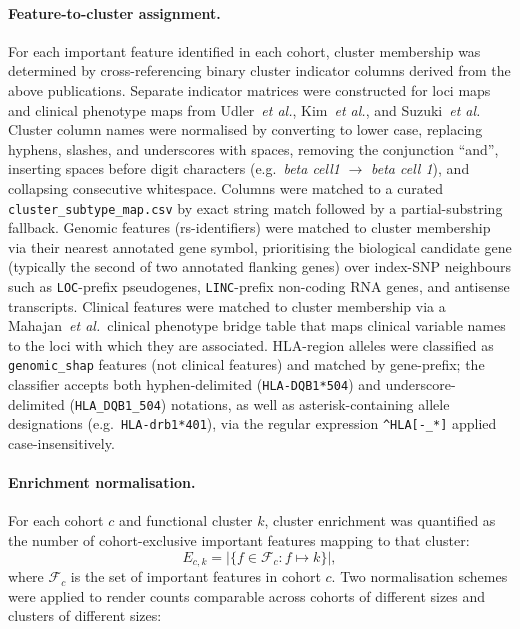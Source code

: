 \paragraph{Feature-to-cluster assignment.}
For each important feature identified in each cohort, cluster membership was determined by cross-referencing binary cluster indicator columns derived from the above publications.
Separate indicator matrices were constructed for loci maps and clinical phenotype maps from Udler~\textit{et al.}, Kim~\textit{et al.}, and Suzuki~\textit{et al.}
Cluster column names were normalised by converting to lower case, replacing hyphens, slashes, and underscores with spaces, removing the conjunction ``and'', inserting spaces before digit characters (e.g.\ \textit{beta cell1} $\to$ \textit{beta cell 1}), and collapsing consecutive whitespace.
Columns were matched to a curated \texttt{cluster\_subtype\_map.csv} by exact string match followed by a partial-substring fallback.
Genomic features (rs-identifiers) were matched to cluster membership via their nearest annotated gene symbol, prioritising the biological candidate gene (typically the second of two annotated flanking genes) over index-SNP neighbours such as \texttt{LOC}-prefix pseudogenes, \texttt{LINC}-prefix non-coding RNA genes, and antisense transcripts.
Clinical features were matched to cluster membership via a Mahajan~\textit{et al.}\ clinical phenotype bridge table that maps clinical variable names to the loci with which they are associated.
HLA-region alleles were classified as \texttt{genomic\_shap} features (not clinical features) and matched by gene-prefix; the classifier accepts both hyphen-delimited (\texttt{HLA-DQB1*504}) and underscore-delimited (\texttt{HLA\_DQB1\_504}) notations, as well as asterisk-containing allele designations (e.g.\ \texttt{HLA-drb1*401}), via the regular expression \texttt{\^{}HLA[-\_*]} applied case-insensitively.

\paragraph{Enrichment normalisation.}
For each cohort $c$ and functional cluster $k$, cluster enrichment was quantified as the number of cohort-exclusive important features mapping to that cluster:
\begin{equation}
  E_{c,k} = \left|\{f \in \mathcal{F}_c : f \mapsto k\}\right|,
\end{equation}
where $\mathcal{F}_c$ is the set of important features in cohort $c$.
Two normalisation schemes were applied to render counts comparable across cohorts of different sizes and clusters of different sizes:

